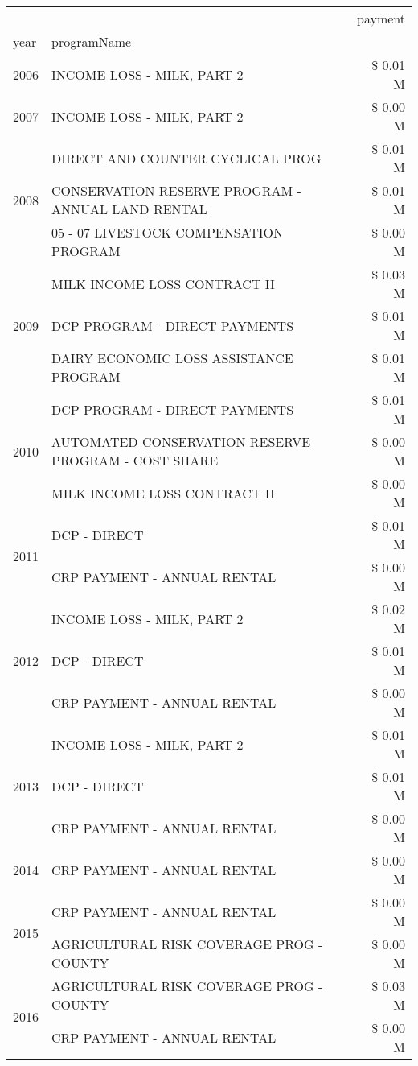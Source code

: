 \begin{tabular}{llr}
\toprule
 &  & payment \\
year & programName &  \\
\midrule
2006 & INCOME LOSS - MILK, PART 2 & \$ 0.01 M \\
\cline{1-3}
2007 & INCOME LOSS - MILK, PART 2 & \$ 0.00 M \\
\cline{1-3}
\multirow[t]{3}{*}{2008} & DIRECT AND COUNTER CYCLICAL PROG & \$ 0.01 M \\
 & CONSERVATION RESERVE PROGRAM - ANNUAL LAND RENTAL & \$ 0.01 M \\
 & 05 - 07 LIVESTOCK COMPENSATION PROGRAM & \$ 0.00 M \\
\cline{1-3}
\multirow[t]{3}{*}{2009} & MILK INCOME LOSS CONTRACT II & \$ 0.03 M \\
 & DCP PROGRAM - DIRECT PAYMENTS & \$ 0.01 M \\
 & DAIRY ECONOMIC LOSS ASSISTANCE PROGRAM & \$ 0.01 M \\
\cline{1-3}
\multirow[t]{3}{*}{2010} & DCP PROGRAM - DIRECT PAYMENTS & \$ 0.01 M \\
 & AUTOMATED CONSERVATION RESERVE PROGRAM - COST SHARE & \$ 0.00 M \\
 & MILK INCOME LOSS CONTRACT II & \$ 0.00 M \\
\cline{1-3}
\multirow[t]{2}{*}{2011} & DCP - DIRECT & \$ 0.01 M \\
 & CRP PAYMENT - ANNUAL RENTAL & \$ 0.00 M \\
\cline{1-3}
\multirow[t]{3}{*}{2012} & INCOME LOSS - MILK, PART 2 & \$ 0.02 M \\
 & DCP - DIRECT & \$ 0.01 M \\
 & CRP PAYMENT - ANNUAL RENTAL & \$ 0.00 M \\
\cline{1-3}
\multirow[t]{3}{*}{2013} & INCOME LOSS - MILK, PART 2 & \$ 0.01 M \\
 & DCP - DIRECT & \$ 0.01 M \\
 & CRP PAYMENT - ANNUAL RENTAL & \$ 0.00 M \\
\cline{1-3}
2014 & CRP PAYMENT - ANNUAL RENTAL & \$ 0.00 M \\
\cline{1-3}
\multirow[t]{2}{*}{2015} & CRP PAYMENT - ANNUAL RENTAL & \$ 0.00 M \\
 & AGRICULTURAL RISK COVERAGE PROG - COUNTY & \$ 0.00 M \\
\cline{1-3}
\multirow[t]{3}{*}{2016} & AGRICULTURAL RISK COVERAGE PROG - COUNTY & \$ 0.03 M \\
 & CRP PAYMENT - ANNUAL RENTAL & \$ 0.00 M \\

\end{tabular}
